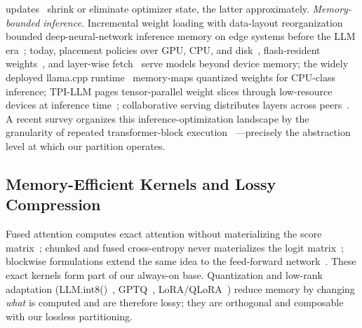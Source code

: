 \documentclass[journal]{IEEEtran}
\begin{document}
updates~\cite{malladi2023mezo} shrink or eliminate optimizer state, the
latter approximately.
\emph{Memory-bounded inference.} Incremental weight loading with
data-layout reorganization bounded deep-neural-network inference memory on
edge systems
before the LLM era~\cite{ji2021incremental}; today, placement policies
over GPU, CPU, and disk~\cite{sheng2023flexgen}, flash-resident weights~\cite{alizadeh2024llmflash},
and layer-wise fetch~\cite{rajbhandari2021zeroinfinity} serve models beyond
device memory; the widely deployed llama.cpp
runtime~\cite{gerganov2023llamacpp} memory-maps quantized weights for
CPU-class inference; TPI-LLM pages tensor-parallel weight slices through
low-resource devices at inference time~\cite{li2025tpillm}; collaborative
serving distributes layers across peers~\cite{borzunov2023petals}. A
recent survey organizes this inference-optimization landscape by the
granularity of repeated transformer-block execution~\cite{kim2026langgiants}%
---precisely the abstraction level at which our partition operates.

\subsection{Memory-Efficient Kernels and Lossy Compression}
Fused attention computes exact attention without materializing the score
matrix~\cite{rabe2021selfattention,dao2022flashattention}; chunked and fused
cross-entropy never materializes the logit
matrix~\cite{milakov2018online,wijmans2025cce,hsu2024liger}; blockwise
formulations extend the same idea to the feed-forward
network~\cite{liu2023blockwise}. These exact kernels form part of our
always-on base. Quantization and low-rank adaptation
(LLM.int8()~\cite{dettmers2022llmint8}, GPTQ~\cite{frantar2023gptq},
LoRA/QLoRA~\cite{hu2022lora,dettmers2023qlora}) reduce memory by changing
\emph{what} is computed and are therefore lossy; they are orthogonal and
composable with our lossless partitioning.
\end{document}
